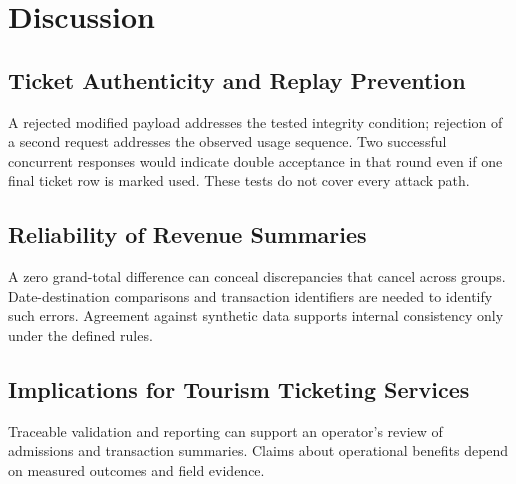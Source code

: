 \documentclass[runningheads]{llncs}
\begin{document}
\section{Discussion}

\subsection{Ticket Authenticity and Replay Prevention}

A rejected modified payload addresses the tested integrity condition;
rejection of a second request addresses the observed usage sequence.
Two successful concurrent responses would indicate double acceptance
in that round even if one final ticket row is marked used. These tests
do not cover every attack path.


\subsection{Reliability of Revenue Summaries}

A zero grand-total difference can conceal discrepancies that cancel
across groups. Date-destination comparisons and transaction identifiers
are needed to identify such errors. Agreement against synthetic data
supports internal consistency only under the defined rules.


\subsection{Implications for Tourism Ticketing Services}

Traceable validation and reporting can support an operator's review
of admissions and transaction summaries. Claims about operational
benefits depend on measured outcomes and field evidence.

\end{document}
